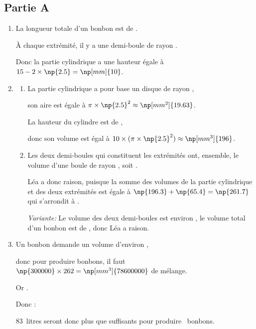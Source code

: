 \subsection*{Partie A}
\begin{enumerate}
	\item La longueur totale d'un bonbon est de .

	À chaque extrémité, il y a une demi-boule de rayon .

	Donc la partie cylindrique a une hauteur égale à {$15-2\times\np{2.5}=\np[mm]{10}$.}

	\item \begin{enumerate}
		\item La partie cylindrique a pour base un disque de rayon ,

		son aire est égale à {$\pi \times\np{2.5}^2\approx\np[mm^2]{19.63}$}.

		La hauteur du cylindre est de ,

		donc son volume est égal à {$10\times(\pi\times\np{2.5}^2)\approx \np[mm^3]{196}$.}

		\item Les deux demi-boules qui constituent les extrémités ont, ensemble, le volume d'une boule de rayon , soit .

		Léa a donc raison, puisque la somme des volumes de la partie cylindrique et des deux extrémités est égale à {$\np{196.3}+\np{65.4}=\np{261.7}$} qui s'arrondit à .

		\textit{Variante:} Le volume des deux demi-boules est environ , le volume total d'un bonbon est de , donc Léa a raison.
	\end{enumerate}

	\item Un bonbon demande un volume d'environ ,

	donc pour produire  bonbons, il faut {$\np{300000}\times262=\np[mm^3]{78600000}$} de mélange.

	Or .

	Donc  :

	83~litres seront donc plus que suffisants pour produire ~bonbons.
\end{enumerate}


